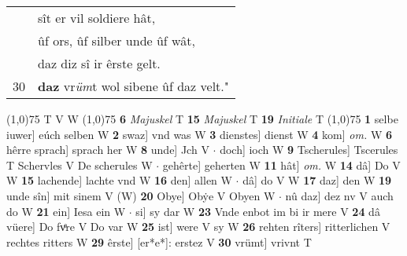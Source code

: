 \documentclass[8pt,a4paper,notitlepage]{article}
\begin{document}
\begin{table}[ht]
\begin{minipage}[t]{0.5\linewidth}
\begin{tabular}{rl}
 & sît er vil soldiere hât,\\ 
 & ûf ors, ûf silber unde ûf wât,\\ 
 & daz diz sî ir êrste gelt.\\ 
30 & \textbf{daz} vr\textit{üm}t wol sibene ûf daz velt."\\ 
\end{tabular}
\scriptsize
\line(1,0){75} \newline
T V W \newline
\line(1,0){75} \newline
\textbf{6} \textit{Majuskel} T  \textbf{15} \textit{Majuskel} T  \textbf{19} \textit{Initiale} T  \newline
\line(1,0){75} \newline
\textbf{1} selbe iuwer] eúch selben W \textbf{2} swaz] vnd was W \textbf{3} dienstes] dienst W \textbf{4} kom] \textit{om.} W \textbf{6} hêrre sprach] sprach her W \textbf{8} unde] Jch V  $\cdot$ doch] ioch W \textbf{9} Tscherules] Tscerules T Schervles V De scherules W  $\cdot$ gehêrte] geherten W \textbf{11} hât] \textit{om.} W \textbf{14} dâ] Do V W \textbf{15} lachende] lachte vnd W \textbf{16} den] allen W  $\cdot$ dâ] do V W \textbf{17} daz] den W \textbf{19} unde sîn] mit sinem V (W) \textbf{20} Obye] Obẏe V Obyen W  $\cdot$ nû daz] dez nv V auch do W \textbf{21} ein] Iesa ein W  $\cdot$ si] sy dar W \textbf{23} Vnde enbot im bi ir mere V \textbf{24} dâ vüere] Do fvͤre V Do var W \textbf{25} ist] were V sy W \textbf{26} rehten rîters] ritterlichen V rechtes ritters W \textbf{29} êrste] [er*e*]: erstez V \textbf{30} vrümt] vrivnt T \newline
\end{minipage}
\end{table}
\end{document}
